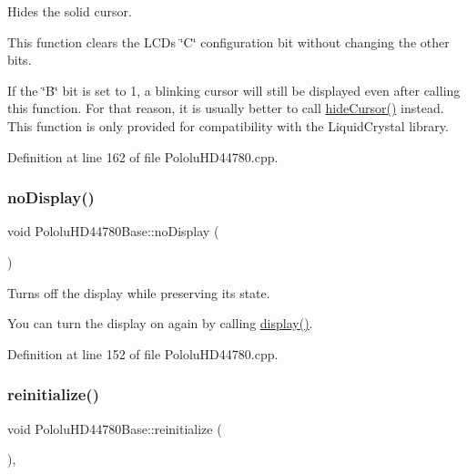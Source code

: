 Hides the solid cursor.

This function clears the L\+CD\textquotesingle{}s \char`\"{}\+C\char`\"{} configuration bit without changing the other bits.

If the \char`\"{}\+B\char`\"{} bit is set to 1, a blinking cursor will still be displayed even after calling this function. For that reason, it is usually better to call \hyperlink{class_pololu_h_d44780_base_a1db083d254d251c479a577f29bcdcec8}{hide\+Cursor()} instead. This function is only provided for compatibility with the Liquid\+Crystal library. 

Definition at line 162 of file Pololu\+H\+D44780.\+cpp.

\mbox{\label{class_pololu_h_d44780_base_abc2d4e126017565c2a0cf2aac67870a0}} 
\subsubsection{\texorpdfstring{no\+Display()}{noDisplay()}}
{\footnotesize\ttfamily void Pololu\+H\+D44780\+Base\+::no\+Display (\begin{DoxyParamCaption}{ }\end{DoxyParamCaption})\hspace{0.3cm}{\ttfamily [inherited]}}

Turns off the display while preserving its state.

You can turn the display on again by calling \hyperlink{class_pololu_h_d44780_base_af5dd1e137bfe9310a418924b7483fcdf}{display()}. 

Definition at line 152 of file Pololu\+H\+D44780.\+cpp.

\mbox{\label{class_pololu_h_d44780_base_a10c1c42406708172fc38b718790ba881}} 
\subsubsection{\texorpdfstring{reinitialize()}{reinitialize()}}
{\footnotesize\ttfamily void Pololu\+H\+D44780\+Base\+::reinitialize (\begin{DoxyParamCaption}{ }\end{DoxyParamCaption})\hspace{0.3cm}{\ttfamily [inline]}, {\ttfamily [inherited]}}

